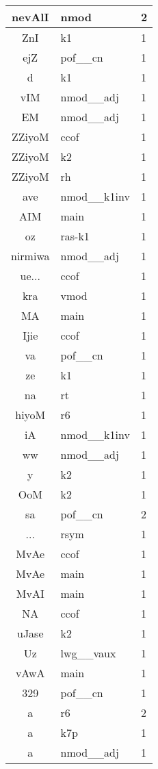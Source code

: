\documentclass[a4 paper]{article}
\begin{document}
\begin{longtable}{cp{}p{}}
nevAlI & nmod & 2\\ \midrule 
ZnI & k1 & 1\\ \midrule 
ejZ & pof\_\_cn & 1\\ \midrule 
d & k1 & 1\\ \midrule 
vIM & nmod\_\_adj & 1\\ \midrule 
EM & nmod\_\_adj & 1\\ \midrule 
ZZiyoM & ccof & 1\\ \midrule ZZiyoM & k2 & 1\\ \midrule ZZiyoM & rh & 1\\ \midrule 
ave & nmod\_\_k1inv & 1\\ \midrule 
AIM & main & 1\\ \midrule 
oz & ras-k1 & 1\\ \midrule 
nirmiwa & nmod\_\_adj & 1\\ \midrule 
ue... & ccof & 1\\ \midrule 
kra & vmod & 1\\ \midrule 
MA & main & 1\\ \midrule 
Ijie & ccof & 1\\ \midrule 
va & pof\_\_cn & 1\\ \midrule 
ze & k1 & 1\\ \midrule 
na & rt & 1\\ \midrule 
hiyoM & r6 & 1\\ \midrule 
iA & nmod\_\_k1inv & 1\\ \midrule 
ww & nmod\_\_adj & 1\\ \midrule 
y & k2 & 1\\ \midrule 
OoM & k2 & 1\\ \midrule 
sa & pof\_\_cn & 2\\ \midrule 
... & rsym & 1\\ \midrule 
MvAe & ccof & 1\\ \midrule MvAe & main & 1\\ \midrule 
MvAI & main & 1\\ \midrule 
NA & ccof & 1\\ \midrule 
uJase & k2 & 1\\ \midrule 
Uz & lwg\_\_vaux & 1\\ \midrule 
vAwA & main & 1\\ \midrule 
329 & pof\_\_cn & 1\\ \midrule 
a & r6 & 2\\ \midrule a & k7p & 1\\ \midrule a & nmod\_\_adj & 1\\ \midrule 

\end{longtable}
\end{document}
